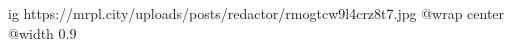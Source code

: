  
 
 
 
 

\ifcmt
  ig https://mrpl.city/uploads/posts/redactor/rmogtcw9l4crz8t7.jpg
  @wrap center
  @width 0.9
\fi
